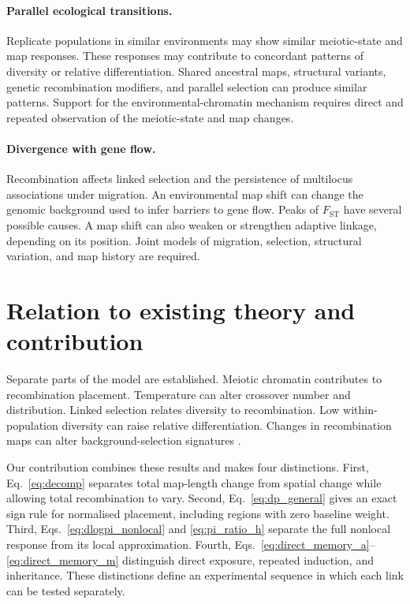 \documentclass[11pt]{article}
\theoremstyle{remark}
\newcommand{\FST}{F_{\mathrm{ST}}}
\begin{document}
\paragraph{Parallel ecological transitions.}
Replicate populations in similar environments may show similar meiotic-state and
map responses. These responses may contribute to concordant patterns of diversity
or relative differentiation. Shared ancestral maps, structural variants, genetic
recombination modifiers, and parallel selection can produce similar patterns.
Support for the environmental-chromatin mechanism requires direct and repeated
observation of the meiotic-state and map changes.

\paragraph{Divergence with gene flow.}
Recombination affects linked selection and the persistence of multilocus
associations under migration. An environmental map shift can change the genomic background used to infer
barriers to gene flow. Peaks of $\FST$ have
several possible causes. A map shift can also weaken or strengthen adaptive
linkage, depending on its position. Joint models of migration, selection,
structural variation, and map history are required.

\section{Relation to existing theory and contribution}
\label{sec:novelty}

Separate parts of the model are established. Meiotic chromatin contributes to
recombination placement. Temperature can alter crossover number and distribution.
Linked selection relates diversity to recombination. Low within-population
diversity can raise relative differentiation. Changes in recombination maps can
alter background-selection signatures
\citep{underwood2018,lloyd2018,modliszewski2018,cruickshank2014,booker2022}.

Our contribution combines these results and makes four distinctions. First,
Eq.~\eqref{eq:decomp} separates total map-length change from spatial change while
allowing total recombination to vary. Second, Eq.~\eqref{eq:dp_general} gives an
exact sign rule for normalised placement, including regions with zero baseline
weight. Third, Eqs.~\eqref{eq:dlogpi_nonlocal} and \eqref{eq:pi_ratio_h} separate
the full nonlocal response from its local approximation. Fourth,
Eqs.~\eqref{eq:direct_memory_a}--\eqref{eq:direct_memory_m} distinguish direct
exposure, repeated induction, and inheritance. These distinctions define an
experimental sequence in which each link can be tested separately.
\end{document}
